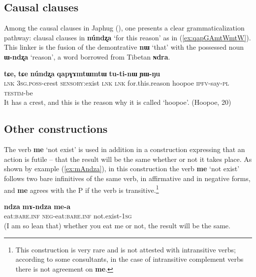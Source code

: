 \documentclass[oldfontcommands,oneside,a4paper,11pt]{article}
\newcommand{\ipa}[1]{\mbox{\phon\textbf{#1}}} %
\begin{document}
   \subsection{Causal clauses}
Among the causal clauses in Japhug (\citealt{jacques14linking}), one presents a clear grammaticalization pathway:  clausal clauses in \ipa{núndʐa} `for this reason' as in (\ref{ex:qapGAmtWmtW}). This linker is the fusion of the demontrative \ipa{nɯ} `that' with the possessed noun \ipa{ɯ-ndʐa} `reason', a word borrowed from Tibetan \ipa{ɴdra}.
   
   
\begin{exe}
\ex \label{ex:qapGAmtWmtW}
\gll
[\ipa{tɕe}  	\ipa{ɯ-mtɯ}  	\ipa{ɣɤʑu}]  	\ipa{tɕe,}  	\ipa{tɕe}  	\textbf{\ipa{núndʐa}}  	\ipa{qapɣɤmtɯmtɯ}  	\ipa{tu-ti-nɯ}  	\ipa{ɲɯ-ŋu}   \\
\textsc{lnk} \textsc{3sg.poss}-crest \textsc{sensory}:exist \textsc{lnk} \textsc{lnk} for.this.reason hoopoe \textsc{ipfv}-say-\textsc{pl} \textsc{testim}-be \\
\glt It has a crest, and this is the reason why it is called `hoopoe'. (Hoopoe, 20)
\end{exe}

%
   
\subsection{Other constructions}
The verb \ipa{me} `not exist' is used in addition in a construction expressing that an action is futile -- that the result will be the same whether or not it takes place. As shown by example (\ref{ex:mAndza}), in this construction the verb \ipa{me} `not exist' follows two bare infinitives of the same verb, in affirmative and in negative forms, and \ipa{me} agrees with the P if the verb is transitive.\footnote{This construction is very rare and is not attested with intransitive verbs; according to some consultants, in the case of intransitive complement verbs there is not agreement on \ipa{me}.}


\begin{exe}
\ex \label{ex:mAndza}
\gll \ipa{ndza} \ipa{mɤ-ndza} \ipa{me-a} \\
eat:\textsc{bare.inf} \textsc{neg}-eat:\textsc{bare.inf} not.exist-\textsc{1sg} \\
\glt (I am so lean that) whether you eat me or not, the result will be the same.
\end{exe}
 
\end{document}
